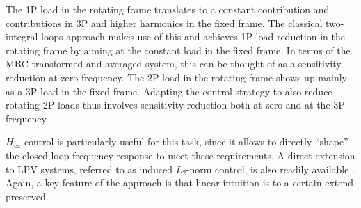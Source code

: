 \documentclass[times]{weauth}
\begin{document}
%
%		




The 1P load in the rotating frame translates to a constant contribution and contributions in 3P and higher harmonics in the fixed frame. 
The classical two-integral-loops approach makes use of this and achieves 1P load reduction in the rotating frame by aiming at the constant load in the fixed frame. 
In terms of the MBC-transformed and averaged system, this can be thought of as a sensitivity reduction at zero frequency.
The 2P load in the rotating frame shows up mainly as a 3P load in the fixed frame. Adapting the control strategy to also reduce rotating 2P loads thus involves sensitivity reduction both at zero and at the 3P frequency. 

$H_\infty$ control is particularly useful for this task, since it allows to directly ``shape'' the closed-loop frequency response to meet these requirements. 
A direct extension to LPV systems, referred to as induced $L_2$-norm control, is also readily available \cite{WuEtAl_96IJRNC_Induced}. 
Again, a key feature of the approach is that linear intuition is to a certain extend preserved.
\end{document}
